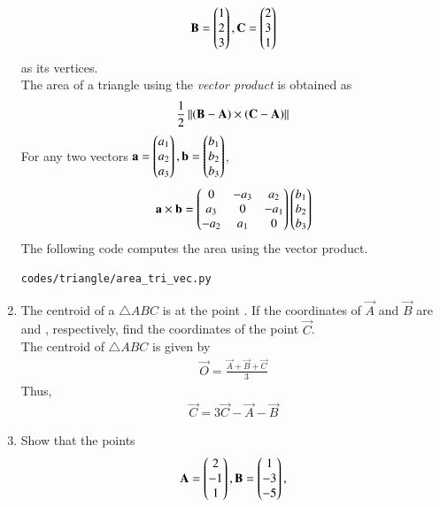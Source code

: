 \begin{enumerate}[label=\arabic*.,ref=\thesubsection.\theenumi]
\begin{align}
\mathbf{B} = \begin{pmatrix}1\\2 \\3\end{pmatrix},
\mathbf{C} = \begin{pmatrix}2\\ 3\\1\end{pmatrix}
\end{align}
%
as its vertices.
\\
\solution The area of a triangle using the {\em vector product} is obtained as
\begin{align}
\frac{1}{2}\left\lVert\left(\mathbf{B}-\mathbf{A}\right)\times \left(\mathbf{C}-\mathbf{A}\right)\right\rVert
\end{align}
%
For any two vectors $\mathbf{a}=\begin{pmatrix}a_1\\a_2\\a_3\end{pmatrix}, \mathbf{b}=\begin{pmatrix}b_1\\b_2\\b_3\end{pmatrix}$, 
\begin{align}
\mathbf{a}\times \mathbf{b} = \begin{pmatrix}0 & -a_3 & a_2 \\ a_3 & 0 & -a_1 \\ -a_2 & a_1 & 0\end{pmatrix}\begin{pmatrix}b_1\\b_2\\b_3\end{pmatrix}
\end{align}
%
The following code computes the area using the vector product.
%
\begin{lstlisting}
codes/triangle/area_tri_vec.py
\end{lstlisting}
%
%
\item The centroid of a $\triangle ABC$ is at the point .  If the coordinates of $\vec{A}$ and $\vec{B}$ are  and , respectively, find the coordinates of the point $\vec{C}$.
%
\\
\solution The centroid of $\triangle ABC$ is given by
\begin{align}
\label{eq:tri_geo_ex_centroid}
\vec{O} = \frac{\vec{A}+\vec{B}+\vec{C}}{3}
\end{align}
%
Thus, 
\begin{align}
\vec{C} = 3\vec{C}-\vec{A}-\vec{B}
\end{align}
%
\item Show that the points 
\begin{align}
\vec{A} = \myvec{2\\-1 \\1},
\vec{B} = \myvec{1\\-3 \\-5},

\end{align}
\end{enumerate}
